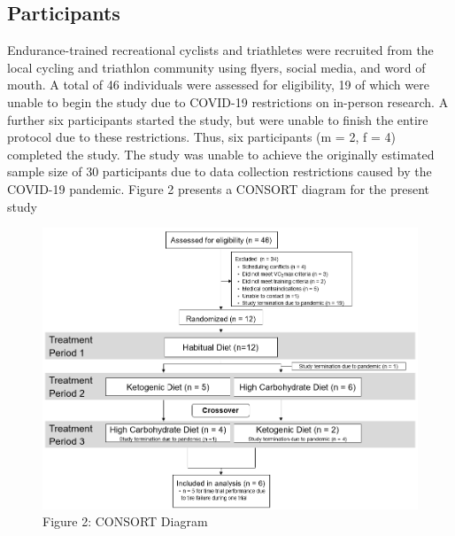 \documentclass[]{cik}%
\begin{document}
\hypertarget{participants}{%
\subsection{Participants}\label{participants}}

Endurance-trained recreational cyclists and triathletes were recruited
from the local cycling and triathlon community using flyers, social
media, and word of mouth. A total of 46 individuals were assessed for
eligibility, 19 of which were unable to begin the study due to COVID-19
restrictions on in-person research. A further six participants started
the study, but were unable to finish the entire protocol due to these
restrictions. Thus, six participants (m = 2, f = 4) completed the study.
The study was unable to achieve the originally estimated sample size of
30 participants due to data collection restrictions caused by the
COVID-19 pandemic. Figure 2 presents a CONSORT diagram for the present
study

\begin{figure}[H]
\includegraphics[width=1\linewidth]{figures/figure2} \caption{Figure 2: CONSORT Diagram}\label{fig:fig2pdf}
\end{figure}
\end{document}
